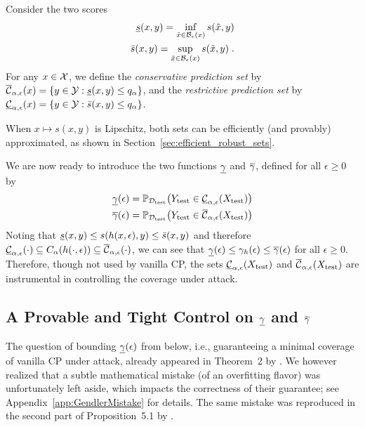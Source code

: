 \begin{definition}
    Consider the two scores
    \begin{align}
        \underline{s}(x,y) = \inf_{\Tilde{x} \in \mathcal{B}_\epsilon(x)} s(\Tilde{x},y) \\
        \Bar{s}(x,y) = \sup_{\Tilde{x} \in \mathcal{B}_\epsilon(x)} s(\Tilde{x},y) \;.
    \end{align}
    For any $x \in \mathcal{X}$, we define the \textit{conservative prediction set} by $\overline{\mathcal{C}}_{\alpha, \epsilon}(x) = \{ y \in \mathcal{Y} : \underline{s}(x,y) \leq q_{\alpha}\}$, and the \textit{restrictive prediction set} by $\underline{\mathcal{C}}_{\alpha, \epsilon}(x) = \{y \in \mathcal{Y}: \Bar{s}(x,y) \leq q_{\alpha}\}$.
\label{def:union-inter-metaset}
\end{definition}

When $x \mapsto s(x,y)$ is Lipschitz, both sets can be efficiently (and provably) approximated, as shown in Section~\ref{sec:efficient_robust_sets}.

We are now ready to introduce the two functions $\underline{\gamma}$ and $\overline{\gamma}$, defined for all $\epsilon \geq 0$ by
%
\begin{align}
    \underline{\gamma}(\epsilon) = \mathbb{P}_{\mathcal{D}_\mathrm{test}}\!\left(Y_\mathrm{test} \in \underline{\mathcal{C}}_{\alpha, \epsilon}(X_\mathrm{test})\right) \\
    \overline{\gamma}(\epsilon) = \mathbb{P}_{\mathcal{D}_\mathrm{test}}\!\left(Y_\mathrm{test} \in \overline{\mathcal{C}}_{\alpha, \epsilon}(X_\mathrm{test})\right)
\end{align}
%
Noting that $\underline{s}(x,y) \leq s(h(x,\epsilon),y) \leq \Bar{s}(x,y)$ and therefore $\underline{\mathcal{C}}_{\alpha, \epsilon}(\cdot)\subseteq C_\alpha(h(\cdot, \epsilon)) \subseteq \overline{\mathcal{C}}_{\alpha, \epsilon}(\cdot)$, we can see that $\underline{\gamma}(\epsilon) \leq \gamma_h(\epsilon) \leq \overline{\gamma}(\epsilon)$ for all $\epsilon \geq 0$. Therefore, though not used by vanilla CP, the sets $\underline{\mathcal{C}}_{\alpha, \epsilon}(X_\mathrm{test})$ and $\overline{\mathcal{C}}_{\alpha, \epsilon}(X_\mathrm{test})$ are instrumental in controlling the coverage under attack.

\subsection{A Provable and Tight Control on $\underline{\gamma}$ and $\overline{\gamma}$}

The question of bounding $\underline{\gamma}(\epsilon)$ from below, i.e., guaranteeing a minimal coverage of vanilla CP under attack, already appeared in Theorem~2 by \citet{rscp}. We however realized that a subtle mathematical mistake (of an overfitting flavor) was unfortunately left aside, which impacts the correctness of their guarantee; see Appendix~\ref{app:GendlerMistake} for details. The same mistake was reproduced in the second part of Proposition~5.1 by \citet{cas}.


